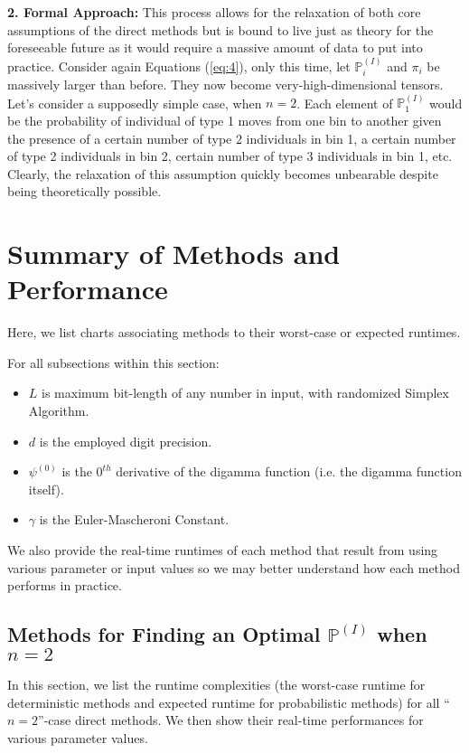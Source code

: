 \documentclass{article}
\begin{document}
\textbf{2. Formal Approach:} This process allows for the relaxation of both core assumptions of the direct methods but is bound to live just as theory for the foreseeable future as it would require a massive amount of data to put into practice. Consider again Equations (\ref{eq:4}), only this time, let $\mathbb{P}^{(I)}_i$ and $\pi_i$ be massively larger than before. They now become very-high-dimensional tensors. Let's consider a supposedly simple case, when $n=2$. Each element of $\mathbb{P}^{(I)}_1$ would be the probability of individual of type 1 moves from one bin to another given the presence of a certain number of type 2 individuals in bin 1, a certain number of type 2 individuals in bin 2, certain number of type 3 individuals in bin 1, etc. Clearly, the relaxation of this assumption quickly becomes unbearable despite being theoretically possible.

\section{Summary of Methods and Performance}
Here, we list charts associating methods to their worst-case or expected runtimes.

For all subsections within this section:
\begin{itemize}
    \item $L$ is maximum bit-length of any number in input, with randomized Simplex Algorithm.
    \item $d$ is the employed digit precision.
    \item $\psi^{(0)}$ is the $0^{th}$ derivative of the digamma function (i.e. the digamma function itself).
    \item $\gamma$ is the Euler-Mascheroni Constant.
\end{itemize}

We also provide the real-time runtimes of each method that result from using various parameter or input values so we may better understand how each method performs in practice.

\subsection{Methods for Finding an Optimal $\mathbb{P}^{(I)}$ when $n=2$}
In this section, we list the runtime complexities (the worst-case runtime for deterministic methods and expected runtime for probabilistic methods) for all ``$n=2$''-case direct methods. We then show their real-time performances for various parameter values.
\end{document}
